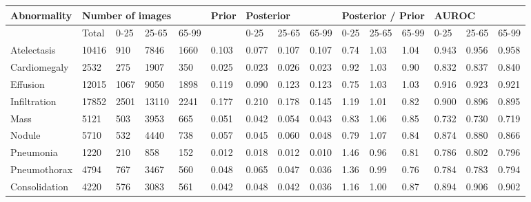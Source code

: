 \documentclass[12pt,oneside,a4paper]{report}
\begin{document}
\begin{landscape}
\begin{table}
\centering
\begin{tabular}{@{}lllllllllllllll@{}}
\toprule
\textbf{Abnormality}        & \multicolumn{4}{l}{\textbf{Number of images}} &  \textbf{Prior} & \multicolumn{3}{l}{\textbf{Posterior}} & \multicolumn{3}{l}{\textbf{Posterior / Prior}} & \multicolumn{3}{l}{\textbf{AUROC}}       \\ \midrule
                   & Total & 0-25 & 25-65 & 65-99 &       & 0-25 & 25-65 & 65-99 & 0-25 & 25-65 & 65-99 & 0-25 & 25-65 & 65-99 \\ \midrule
Atelectasis        & 10416 & 910      & 7846          & 1660     & 0.103 & 0.077    & 0.107         & 0.107    & 0.74     & 1.03          & 1.04     & 0.943    & 0.956         & 0.958    \\ \midrule
Cardiomegaly       & 2532  & 275      & 1907          & 350      & 0.025 & 0.023    & 0.026         & 0.023    & 0.92     & 1.03          & 0.90     & 0.832    & 0.837         & 0.840    \\ \midrule
Effusion           & 12015 & 1067     & 9050          & 1898     & 0.119 & 0.090    & 0.123         & 0.123    & 0.75     & 1.03          & 1.03     & 0.916    & 0.923         & 0.921    \\ \midrule
Infiltration       & 17852 & 2501     & 13110         & 2241     & 0.177 & 0.210    & 0.178         & 0.145    & 1.19     & 1.01          & 0.82     & 0.900    & 0.896         & 0.895    \\ \midrule
Mass               & 5121  & 503      & 3953          & 665      & 0.051 & 0.042    & 0.054         & 0.043    & 0.83     & 1.06          & 0.85     & 0.732    & 0.730         & 0.719    \\ \midrule
Nodule             & 5710  & 532      & 4440          & 738      & 0.057 & 0.045    & 0.060         & 0.048    & 0.79     & 1.07          & 0.84     & 0.874    & 0.880         & 0.866    \\ \midrule
Pneumonia          & 1220  & 210      & 858           & 152      & 0.012 & 0.018    & 0.012         & 0.010    & 1.46     & 0.96          & 0.81     & 0.786    & 0.802         & 0.796    \\ \midrule
Pneumothorax       & 4794  & 767      & 3467          & 560      & 0.048 & 0.065    & 0.047         & 0.036    & 1.36     & 0.99          & 0.76     & 0.784    & 0.783         & 0.794    \\ \midrule
Consolidation      & 4220  & 576      & 3083          & 561      & 0.042 & 0.048    & 0.042         & 0.036    & 1.16     & 1.00          & 0.87     & 0.894    & 0.906         & 0.902    \\ \midrule

\end{tabular}
\end{table}
\end{landscape}
\end{document}
